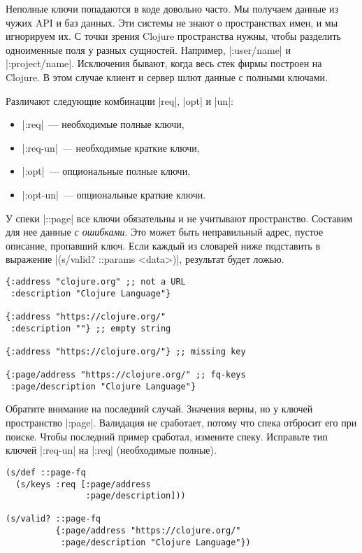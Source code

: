 Неполные ключи попадаются в коде довольно часто. Мы получаем данные из чужих API
и баз данных. Эти системы не знают о пространствах имен, и мы игнорируем их. С
точки зрения Clojure пространства нужны, чтобы разделить одноименные поля у
разных сущностей. Например, \spverb|:user/name| и \spverb|:project/name|.
Исключения бывают, когда весь стек фирмы построен на Clojure. В этом случае
клиент и сервер шлют данные с полными ключами.

Различают следующие комбинации \spverb|req|, \spverb|opt| и \spverb|un|:

\begin{itemize}

\item
  \spverb|:req|~--- необходимые полные ключи,

\item
  \spverb|:req-un|~--- необходимые краткие ключи,

\item
  \spverb|:opt|~--- опциональные полные ключи,

\item
  \spverb|:opt-un|~--- опциональные краткие ключи.

\end{itemize}

У спеки \spverb|::page| все ключи обязательны и не учитывают
пространство. Составим для нее данные \emph{с ошибками}. Это может быть
неправильный адрес, пустое описание, пропавший ключ. Если каждый из словарей
ниже подставить в выражение \spverb|(s/valid? ::params <data>)|, результат будет
ложью.

\begin{verbatim}
{:address "clojure.org" ;; not a URL
 :description "Clojure Language"}

{:address "https://clojure.org/"
 :description ""} ;; empty string

{:address "https://clojure.org/"} ;; missing key

{:page/address "https://clojure.org/" ;; fq-keys
 :page/description "Clojure Language"}
\end{verbatim}

Обратите внимание на последний случай. Значения верны, но у ключей пространство
\spverb|:page|. Валидация не сработает, потому что спека отбросит его при
поиске. Чтобы последний пример сработал, измените спеку. Исправьте тип ключей
\spverb|:req-un| на \spverb|:req| (необходимые полные).

\begin{verbatim}
(s/def ::page-fq
  (s/keys :req [:page/address
                :page/description]))

(s/valid? ::page-fq
          {:page/address "https://clojure.org/"
           :page/description "Clojure Language"})
\end{verbatim}

